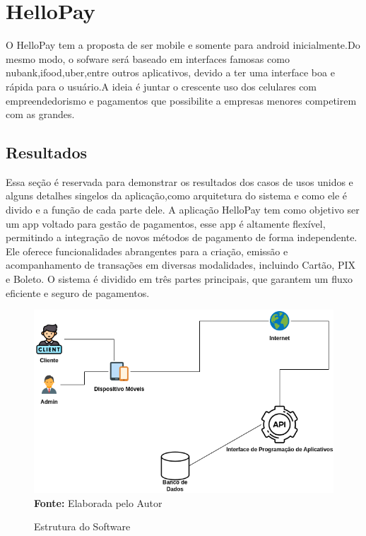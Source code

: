 \documentclass[a4paper,12pt]{article}
\begin{document}
\section{HelloPay}
\hspace{0.5cm}O HelloPay tem a proposta de ser mobile e somente para android inicialmente.Do mesmo modo, o sofware será baseado em interfaces famosas como nubank,ifood,uber,entre outros aplicativos, devido a ter uma interface boa e rápida para o usuário.A ideia é juntar o crescente uso dos celulares com empreendedorismo e pagamentos que possibilite a empresas menores competirem com as grandes.
\subsection{Resultados}
\hspace{0.5cm}Essa seção é reservada para demonstrar os resultados dos casos de usos unidos e alguns detalhes singelos da aplicação,como arquitetura do sistema e como ele é divido e a função de cada parte dele.
\newline A aplicação HelloPay tem como objetivo ser um app voltado para  gestão de pagamentos, esse app é altamente flexível, permitindo a integração de novos métodos de pagamento de forma independente. Ele oferece funcionalidades abrangentes para a criação, emissão e acompanhamento de transações em diversas modalidades, incluindo Cartão, PIX e Boleto. O sistema é dividido em três partes principais, que garantem um fluxo eficiente e seguro de pagamentos.
\newpage
\begin{figure}[ht!]
    \centering
    \caption{Estrutura do Software}
    \includegraphics[width=15cm]{imagens/Estrutura do software.drawio.png}
    \textbf{Fonte:} Elaborada pelo Autor
\end{figure}
\end{document}
